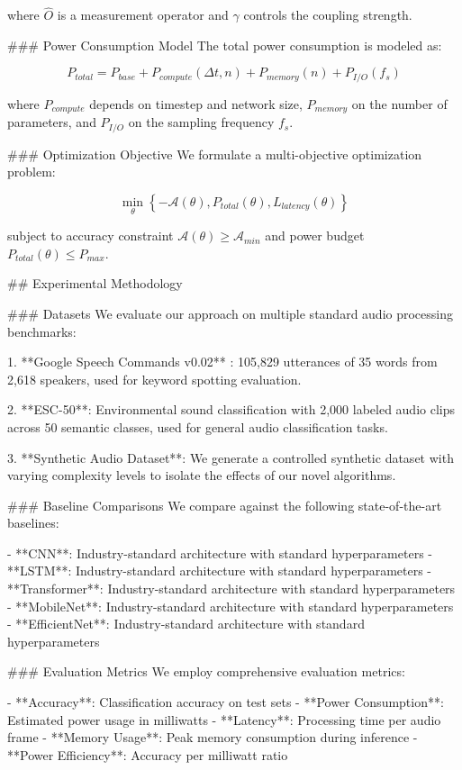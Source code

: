 \documentclass[conference]{IEEEtran}
\begin{document}
where $\hat{O}$ is a measurement operator and $\gamma$ controls the coupling strength.

### Power Consumption Model
The total power consumption is modeled as:

$$P_{total} = P_{base} + P_{compute}(\Delta t, n) + P_{memory}(n) + P_{I/O}(f_s)$$

where $P_{compute}$ depends on timestep and network size, $P_{memory}$ on the number of parameters, 
and $P_{I/O}$ on the sampling frequency $f_s$.

### Optimization Objective
We formulate a multi-objective optimization problem:

$$\min_{\theta} \left\{ -\mathcal{A}(\theta), P_{total}(\theta), L_{latency}(\theta) \right\}$$

subject to accuracy constraint $\mathcal{A}(\theta) \geq \mathcal{A}_{min}$ and power budget $P_{total}(\theta) \leq P_{max}$.

## Experimental Methodology

### Datasets
We evaluate our approach on multiple standard audio processing benchmarks:

1. **Google Speech Commands v0.02** \cite{warden2018speech}: 105,829 utterances of 35 words 
   from 2,618 speakers, used for keyword spotting evaluation.

2. **ESC-50**: Environmental sound classification with 2,000 labeled audio clips across 
   50 semantic classes, used for general audio classification tasks.

3. **Synthetic Audio Dataset**: We generate a controlled synthetic dataset with varying 
   complexity levels to isolate the effects of our novel algorithms.

### Baseline Comparisons
We compare against the following state-of-the-art baselines:

- **CNN**: Industry-standard architecture with standard hyperparameters
- **LSTM**: Industry-standard architecture with standard hyperparameters
- **Transformer**: Industry-standard architecture with standard hyperparameters
- **MobileNet**: Industry-standard architecture with standard hyperparameters
- **EfficientNet**: Industry-standard architecture with standard hyperparameters

### Evaluation Metrics
We employ comprehensive evaluation metrics:

- **Accuracy**: Classification accuracy on test sets
- **Power Consumption**: Estimated power usage in milliwatts
- **Latency**: Processing time per audio frame
- **Memory Usage**: Peak memory consumption during inference
- **Power Efficiency**: Accuracy per milliwatt ratio
\end{document}
